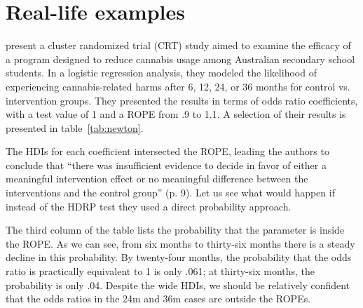 \documentclass[man]{apa}
\newcommand{\hdr}{HDRP}
\begin{document}
\section*{Real-life examples}


 present a cluster randomized trial (CRT) study aimed to examine the efficacy of a program designed to reduce cannabis usage among Australian secondary school students. In a logistic regression analysis, they modeled the likelihood of experiencing cannabis-related harms after 6, 12, 24, or 36 months for control vs. intervention groups. They presented the results in terms of odds ratio coefficients, with a test value of 1 and a ROPE from .9 to 1.1. A selection of their results is presented in table~\ref{tab:newton}. 


\afcp{}

The HDIs for each coefficient intersected the ROPE, leading the authors to conclude that ``there was insufficient evidence to decide in favor of either a meaningful intervention effect or no meaningful difference between the interventions and the control group'' (p. 9). Let us see what would happen if instead of the \hdr{} test they used a direct probability approach.

The third column of the table lists the probability that the parameter is inside the ROPE. As we can see, from six months to thirty-six months there is a steady decline in this probability. By twenty-four months, the probability that the odds ratio is practically equivalent to 1 is only .061; at thirty-six months, the probability is only .04. Despite the wide HDIs, we should be relatively confident that the odds ratios in the 24m and 36m cases are outside the ROPEs.
\end{document}

